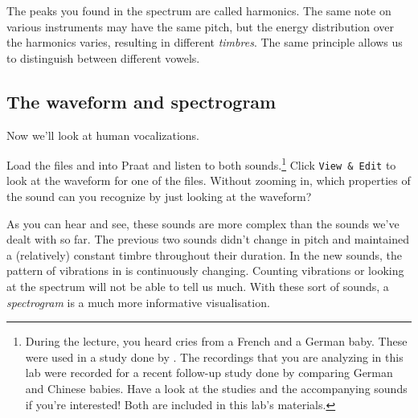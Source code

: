 \documentclass[a4paper, 9pt]{article}
\begin{document}
The peaks you found in the spectrum are called harmonics. The same note
on various instruments may have the same pitch, but the energy
distribution over the harmonics varies, resulting in different
\emph{timbres}. The same principle allows us to distinguish between
different vowels.

\newpage
\subsection{The waveform and
spectrogram}\label{the-waveform-and-spectrogram}

Now we'll look at human vocalizations.

\begin{exercise}
\action Load the files  and  into Praat and listen to both sounds.\footnote{During the lecture, you heard cries from a French and a German baby. These were used in a study done by \cite{Mampe2009}. The recordings that you are analyzing in this lab were recorded for a recent follow-up study done by \cite{Wermke2016} comparing German and Chinese babies. Have a look at the studies and the accompanying sounds if you're interested! Both are included in this lab's materials.}
\action Click \texttt{View \& Edit} to look at the waveform for one of the files. Without zooming in, which properties of the sound can you recognize by just looking at the waveform?
\end{exercise}

As you can hear and see, these sounds are more complex than the sounds
we've dealt with so far. The previous two sounds didn't change in pitch
and maintained a (relatively) constant timbre throughout their duration.
In the new sounds, the pattern of vibrations in is continuously
changing. Counting vibrations or looking at the spectrum will not be
able to tell us much. With these sort of sounds, a \emph{spectrogram} is
a much more informative visualisation. 
\end{document}
